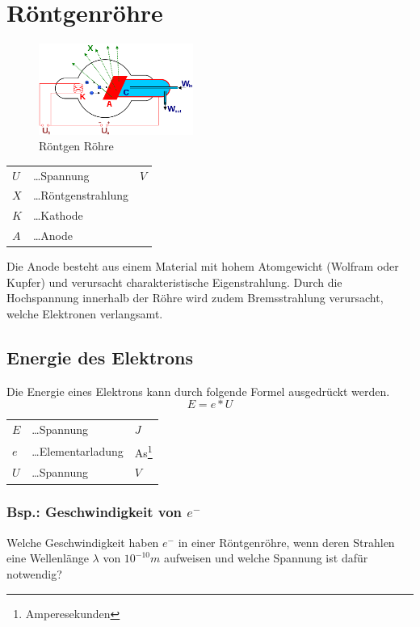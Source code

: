 \documentclass{school}
\begin{document}
\section{Röntgenröhre}
\begin{figure}[!ht]
\centering
    \includegraphics[width=0.45\textwidth]{roentgen-roehre.png}
    \caption[https://de.wikipedia.org/wiki/Röntgenröhre]{Röntgen Röhre}
\end{figure}
\begin{center}
    \begin{tabular}{l l l}
        $U$ &\dots Spannung & $V$\\
        $X$ &\dots Röntgenstrahlung &\\
        $K$ &\dots Kathode &\\
        $A$ &\dots Anode &
    \end{tabular}
\end{center}
Die Anode besteht aus einem Material mit hohem Atomgewicht (Wolfram oder Kupfer) und verursacht charakteristische Eigenstrahlung. Durch die Hochspannung innerhalb der Röhre wird zudem Bremsstrahlung verursacht, welche Elektronen verlangsamt.

\subsection{Energie des Elektrons}
Die Energie eines Elektrons kann durch folgende Formel ausgedrückt werden.
$$E = e * U$$
\begin{center}
    \begin{tabular}{l l l}
        $E$ &\dots Spannung & $J$\\
        $e$ &\dots Elementarladung & As\footnote{Amperesekunden}\\
        $U$ &\dots Spannung & $V$
    \end{tabular}
\end{center}

\newpage
\subsubsection{Bsp.: Geschwindigkeit von $e^-$}
Welche Geschwindigkeit haben $e^-$ in einer Röntgenröhre, wenn deren Strahlen eine Wellenlänge $\lambda$ von $10^{-10}m$ aufweisen und welche Spannung ist dafür notwendig?
\end{document}
